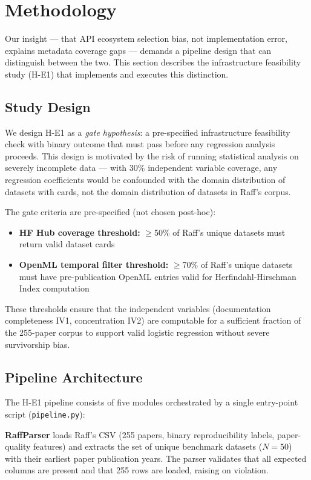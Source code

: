 \section{Methodology}
\label{sec:methodology}

Our insight --- that API ecosystem selection bias, not implementation error, explains metadata coverage gaps --- demands a pipeline design that can distinguish between the two. This section describes the infrastructure feasibility study (H-E1) that implements and executes this distinction.

\subsection{Study Design}

We design H-E1 as a \emph{gate hypothesis}: a pre-specified infrastructure feasibility check with binary outcome that must pass before any regression analysis proceeds. This design is motivated by the risk of running statistical analysis on severely incomplete data --- with 30\% independent variable coverage, any regression coefficients would be confounded with the domain distribution of datasets with cards, not the domain distribution of datasets in Raff's corpus.

The gate criteria are pre-specified (not chosen post-hoc):
\begin{itemize}
  \item \textbf{HF Hub coverage threshold:} $\geq$50\% of Raff's unique datasets must return valid dataset cards
  \item \textbf{OpenML temporal filter threshold:} $\geq$70\% of Raff's unique datasets must have pre-publication OpenML entries valid for Herfindahl-Hirschman Index computation
\end{itemize}

These thresholds ensure that the independent variables (documentation completeness IV1, concentration IV2) are computable for a sufficient fraction of the 255-paper corpus to support valid logistic regression without severe survivorship bias.

\subsection{Pipeline Architecture}

The H-E1 pipeline consists of five modules orchestrated by a single entry-point script (\texttt{pipeline.py}):

\textbf{RaffParser} loads Raff's CSV (255 papers, binary reproducibility labels, paper-quality features) and extracts the set of unique benchmark datasets ($N=50$) with their earliest paper publication years. The parser validates that all expected columns are present and that 255 rows are loaded, raising on violation.

